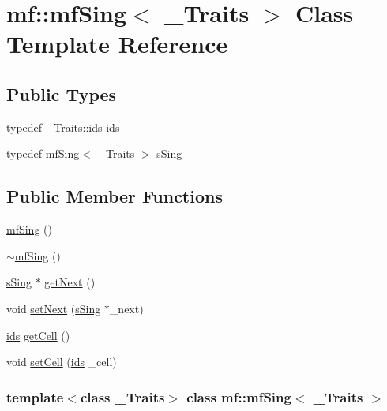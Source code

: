 \hypertarget{classmf_1_1mfSing}{
\section{mf::mfSing$<$ \_\-Traits $>$ Class Template Reference}
\label{classmf_1_1mfSing}
}
\subsection*{Public Types}
\begin{DoxyCompactItemize}
\item 
typedef \_\-Traits::ids \hyperlink{classmf_1_1mfSing_a2b7b2246fabd10500aa23792900ffa5a}{ids}
\item 
typedef \hyperlink{classmf_1_1mfSing}{mfSing}$<$ \_\-Traits $>$ \hyperlink{classmf_1_1mfSing_a06d61023a91b916dd86e6a56a62dcbb2}{sSing}
\end{DoxyCompactItemize}
\subsection*{Public Member Functions}
\begin{DoxyCompactItemize}
\item 
\hyperlink{classmf_1_1mfSing_a1d88a4a40e1a978e8b42b1944f8ab5ad}{mfSing} ()
\item 
\hyperlink{classmf_1_1mfSing_acfc045aa59c8dde458b3bc4ca3077ac5}{$\sim$mfSing} ()
\item 
\hyperlink{classmf_1_1mfSing}{sSing} $\ast$ \hyperlink{classmf_1_1mfSing_aeccff777fb1a65aed98f35d20ba8b3c8}{getNext} ()
\item 
void \hyperlink{classmf_1_1mfSing_a06575423647881c2a37a960531b587ba}{setNext} (\hyperlink{classmf_1_1mfSing}{sSing} $\ast$\_\-next)
\item 
\hyperlink{classmf_1_1mfSing_a2b7b2246fabd10500aa23792900ffa5a}{ids} \hyperlink{classmf_1_1mfSing_a80d7f9eb1dadc79d0119786ef9aabce8}{getCell} ()
\item 
void \hyperlink{classmf_1_1mfSing_adee93728a924425fd113d286abfa52dd}{setCell} (\hyperlink{classmf_1_1mfSing_a2b7b2246fabd10500aa23792900ffa5a}{ids} \_\-cell)
\end{DoxyCompactItemize}
\subsubsection*{template$<$class \_\-Traits$>$ class mf::mfSing$<$ \_\-Traits $>$}



